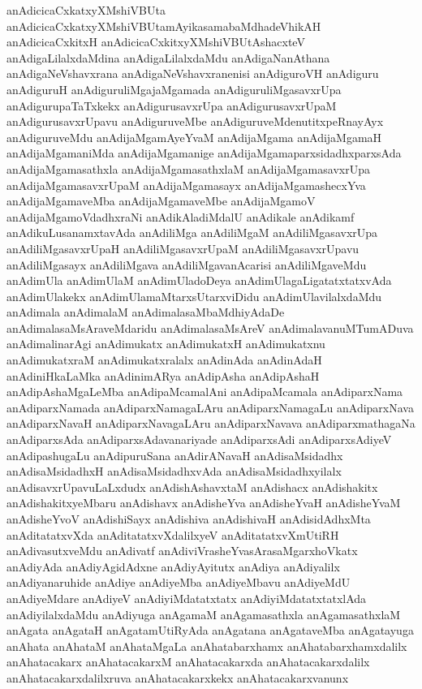 {anAdicicaCxkatxyXMshiVBUta
anAdicicaCxkatxyXMshiVBUtamAyikasamabaMdhadeVhikAH
anAdicicaCxkitxH
anAdicicaCxkitxyXMshiVBUtAshacxteV
anAdigaLilalxdaMdina
anAdigaLilalxdaMdu
anAdigaNanAthana
anAdigaNeVshavxrana
anAdigaNeVshavxranenisi
anAdiguroVH
anAdiguru
anAdiguruH
anAdiguruliMgajaMgamada
anAdiguruliMgasavxrUpa
anAdigurupaTaTxkekx
anAdigurusavxrUpa
anAdigurusavxrUpaM
anAdigurusavxrUpavu
anAdiguruveMbe
anAdiguruveMdenutitxpeRnayAyx
anAdiguruveMdu
anAdijaMgamAyeYvaM
anAdijaMgama
anAdijaMgamaH
anAdijaMgamaniMda
anAdijaMgamanige
anAdijaMgamaparxsidadhxparxsAda
anAdijaMgamasathxla
anAdijaMgamasathxlaM
anAdijaMgamasavxrUpa
anAdijaMgamasavxrUpaM
anAdijaMgamasayx
anAdijaMgamashecxYva
anAdijaMgamaveMba
anAdijaMgamaveMbe
anAdijaMgamoV
anAdijaMgamoVdadhxraNi
anAdikAladiMdalU
anAdikale
anAdikamf
anAdikuLusanamxtavAda
anAdiliMga
anAdiliMgaM
anAdiliMgasavxrUpa
anAdiliMgasavxrUpaH
anAdiliMgasavxrUpaM
anAdiliMgasavxrUpavu
anAdiliMgasayx
anAdiliMgava
anAdiliMgavanAcarisi
anAdiliMgaveMdu
anAdimUla
anAdimUlaM
anAdimUladoDeya
anAdimUlagaLigatatxtatxvAda
anAdimUlakekx
anAdimUlamaMtarxsUtarxviDidu
anAdimUlavilalxdaMdu
anAdimala
anAdimalaM
anAdimalasaMbaMdhiyAdaDe
anAdimalasaMsAraveMdaridu
anAdimalasaMsAreV
anAdimalavanuMTumADuva
anAdimalinarAgi
anAdimukatx
anAdimukatxH
anAdimukatxnu
anAdimukatxraM
anAdimukatxralalx
anAdinAda
anAdinAdaH
anAdiniHkaLaMka
anAdinimARya
anAdipAsha
anAdipAshaH
anAdipAshaMgaLeMba
anAdipaMcamalAni
anAdipaMcamala
anAdiparxNama
anAdiparxNamada
anAdiparxNamagaLAru
anAdiparxNamagaLu
anAdiparxNava
anAdiparxNavaH
anAdiparxNavagaLAru
anAdiparxNavava
anAdiparxmathagaNa
anAdiparxsAda
anAdiparxsAdavanariyade
anAdiparxsAdi
anAdiparxsAdiyeV
anAdipashugaLu
anAdipuruSana
anAdirANavaH
anAdisaMsidadhx
anAdisaMsidadhxH
anAdisaMsidadhxvAda
anAdisaMsidadhxyilalx
anAdisavxrUpavuLaLxdudx
anAdishAshavxtaM
anAdishacx
anAdishakitx
anAdishakitxyeMbaru
anAdishavx
anAdisheYva
anAdisheYvaH
anAdisheYvaM
anAdisheYvoV
anAdishiSayx
anAdishiva
anAdishivaH
anAdisidAdhxMta
anAditatatxvXda
anAditatatxvXdalilxyeV
anAditatatxvXmUtiRH
anAdivasutxveMdu
anAdivatf
anAdiviVrasheYvasArasaMgarxhoVkatx
anAdiyAda
anAdiyAgidAdxne
anAdiyAyitutx
anAdiya
anAdiyalilx
anAdiyanaruhide
anAdiye
anAdiyeMba
anAdiyeMbavu
anAdiyeMdU
anAdiyeMdare
anAdiyeV
anAdiyiMdatatxtatx
anAdiyiMdatatxtatxlAda
anAdiyilalxdaMdu
anAdiyuga
anAgamaM
anAgamasathxla
anAgamasathxlaM
anAgata
anAgataH
anAgatamUtiRyAda
anAgatana
anAgataveMba
anAgatayuga
anAhata
anAhataM
anAhataMgaLa
anAhatabarxhamx
anAhatabarxhamxdalilx
anAhatacakarx
anAhatacakarxM
anAhatacakarxda
anAhatacakarxdalilx
anAhatacakarxdalilxruva
anAhatacakarxkekx
anAhatacakarxvanunx
}
